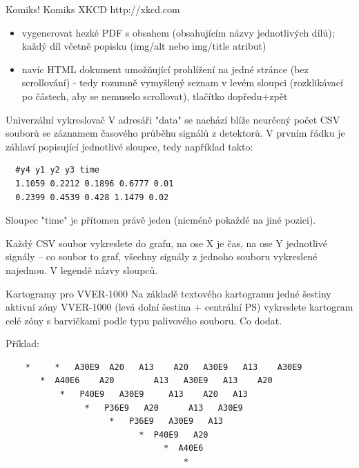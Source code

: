 \documentclass{beamer}
\begin{document}
\begin{frame}{Komiks!}
  Komiks XKCD http://xkcd.com
  
  \begin{itemize}
    \item vygenerovat hezké PDF s obsahem (obsahujícím názvy jednotlivých dílů); každý díl včetně popisku (img/alt nebo img/title atribut)
    \item navíc HTML dokument umožňující prohlížení na jedné stránce (bez scrollování) - tedy rozumně vymyšlený seznam v levém sloupci (rozklikávací po částech, aby se nemuselo scrollovat), tlačítko dopředu+zpět
  \end{itemize}

\end{frame}

\begin{frame}[containsverbatim]{Univerzální vykreslovač}
  V adresáři "data" se nachází blíže neurčený počet CSV souborů se záznamem časového průběhu signálů z detektorů. V prvním řádku je záhlaví popisující jednotlivé sloupce, tedy například takto:

\begin{verbatim}
  #y4 y1 y2 y3 time
  1.1059 0.2212 0.1896 0.6777 0.01
  0.2399 0.4539 0.428 1.1479 0.02
\end{verbatim}  

  Sloupec "time" je přítomen právě jeden (nicméně pokaždé na jiné pozici). 

  Každý CSV soubor vykreslete do grafu, na ose X je čas, na ose Y jednotlivé signály -- co soubor to graf, všechny signály z jednoho souboru vykreslené najednou. V legendě názvy sloupců.
  
\end{frame}

\begin{frame}[containsverbatim]{Kartogramy pro VVER-1000}
    Na základě textového kartogramu jedné šestiny aktivní zóny VVER-1000 (levá dolní šestina + centrální PS) vykreslete kartogram celé zóny s barvičkami podle typu palivového souboru. Co dodat.

  Příklad:
  \tiny
\begin{verbatim}
    *     *   A30E9  A20   A13    A20   A30E9   A13    A30E9
       *  A40E6    A20        A13   A30E9   A13    A20
           *   P40E9   A30E9     A13    A20   A13
                *   P36E9   A20      A13   A30E9
                     *   P36E9   A30E9   A13
                           *  P40E9   A20
                                *  A40E6
                                    *  
\end{verbatim}
\end{frame}
\end{document}

